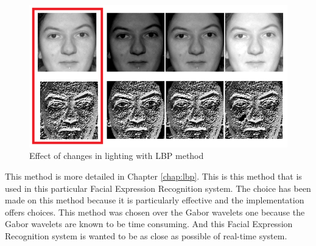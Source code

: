 \begin{figure}[!h]
\begin{center}
\noindent \includegraphics[scale=0.6]{figures/lbp_change_lighting} 
\newline
\caption{Effect of changes in lighting with LBP method}
\label{lbp_change_lighting}
\end{center} 
\end{figure}

\noindent This method is more detailed in Chapter \ref{chap:lbp}. This is this method that is used in this particular Facial Expression Recognition system. The choice has been made on this method because it is particularly effective and the implementation offers choices. This method was chosen over the Gabor wavelets one because the Gabor wavelets are known to be time consuming. And this Facial Expression Recognition system is wanted to be as close as possible of real-time system.
\newline

